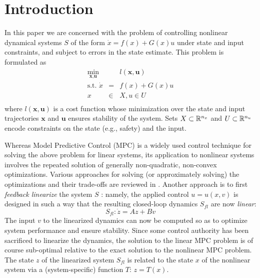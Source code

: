 \section{Introduction}
\label{sec:intro}

In this paper we are concerned with the problem of controlling nonlinear dynamical systems $S$ of the form $\dot{x} = f(x) + G(x)u$ under state and input constraints, and subject to errors in the state estimate.
This problem is formulated as
\begin{eqnarray}
	\label{eq:generic NLMPC}
	\min_{\textbf{x},\textbf{u}} &\;& l(\textbf{x}, \textbf{u}) \\
	\text{s.t. } \dot{x}&=&f(x) + G(x)u \nonumber \\
	x&\in& X, u \in U  \nonumber\\
\end{eqnarray}
where $l(\textbf{x}, \textbf{u})$ is a cost function whose minimization over the state and input trajectories $\textbf{x}$ and $\textbf{u}$ ensures stability of the system. 
Sets $X \subset \mathbb{R}^{n_x}$ and $ U \subset \mathbb{R}^{n_u}$ encode constraints on the state (e.g., safety) and the input.

Whereas Model Predictive Control (MPC) is a widely used control technique for solving the above problem for linear systems, its application to nonlinear systems involves the repeated solution of generally non-quadratic, non-convex optimizations.
Various approaches for solving (or approximately solving) the optimizations and their trade-offs are reviewed in \cite{Cannon04_EfficientMPC}.
Another approach is to first \emph{feedback linearize} the system $S$ \cite{khalil}: namely, the applied control $u = u(x,v)$ is designed in such a way that the resulting closed-loop dynamics $S_{fl}$ are now \emph{linear}:
	\[S_{fl}: \dot{z} = Az + Bv\]
The input $v$ to the linearized dynamics can now be computed so as to optimize system performance and ensure stability.
Since some control authority has been sacrificed to linearize the dynamics, the solution to the linear MPC problem is of course sub-optimal relative to the exact solution to the nonlinear MPC problem.
The state $z$ of the linearized system $S_{fl}$ is related to the state $x$ of the nonlinear system via a (system-specific) function $T$: $z=T(x)$.

